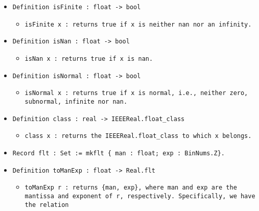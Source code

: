 \documentclass[11pt]{report}
\begin{document}
\begin{itemize}
\item  \texttt{Definition isFinite : float -> bool}

\begin{itemize}
\item  \texttt{isFinite x :  returns true if x is neither nan nor an infinity.}



\end{itemize}

\item  \texttt{Definition isNan : float -> bool}

\begin{itemize}
\item  \texttt{isNan x : returns true if x is nan.}



\end{itemize}

\item  \texttt{Definition isNormal : float -> bool}

\begin{itemize}
\item  \begin{flushleft} \texttt{isNormal x : returns true if x is normal, i.e., neither zero, subnormal, infinite nor nan.} \end{flushleft}



\end{itemize}

\item  \texttt{Definition class : real -> IEEEReal.float\_class}

\begin{itemize}
\item  \texttt{class x : returns the IEEEReal.float\_class to which x belongs.}
\end{itemize}

\item  \texttt{Record flt : Set := mkflt \{ man : float; exp : BinNums.Z\}.}



\item  \texttt{Definition toManExp : float -> Real.flt}

\begin{itemize}
\item   \begin{flushleft} \texttt{toManExp r : returns \{man, exp\}, where man and exp are the mantissa and exponent of r, respectively. Specifically, we have the relation}  \end{flushleft}


\end{itemize}
\end{itemize}
\end{document}
